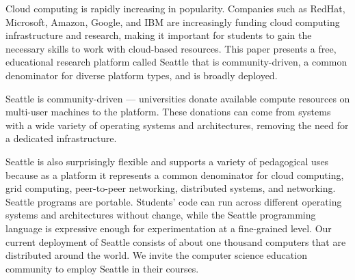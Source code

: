 \abstract


Cloud computing is rapidly increasing in popularity. Companies such as
RedHat, Microsoft, Amazon, Google, and IBM are increasingly funding
cloud computing infrastructure and research, making it important for
students to gain the necessary skills to work with cloud-based
resources. This paper presents a free, educational research platform
called Seattle that is community-driven, a common denominator for
diverse platform types, and is broadly deployed.

Seattle is community-driven --- universities donate available compute
resources on multi-user machines to the platform. These donations can
come from systems with a wide variety of operating systems and
architectures, removing the need for a dedicated infrastructure.

Seattle is also surprisingly flexible and supports a variety of
pedagogical uses because as a platform it represents a common denominator 
for cloud computing, grid computing, peer-to-peer networking,
distributed systems, and networking. Seattle programs are portable.
Students' code can run across different operating systems and
architectures without change, while the Seattle programming language
is expressive enough for experimentation at a fine-grained level. Our
current deployment of Seattle consists of about one thousand computers
that are distributed around the world. We invite the computer science
education community to employ Seattle in their courses.


%
%
%

